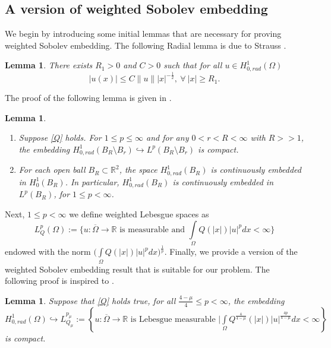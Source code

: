 \documentclass[11pt]{amsart}
\numberwithin{equation}{section}
\newtheorem{lem}[thm]{Lemma}
\newcommand{\R}{\mathbb{R}}
\newcommand{\hr}{H^1_{0, rad}(\Omega)}
\newcommand{\1}{\frac{1}{2}}
\begin{document}
	\subsection{A version of weighted Sobolev embedding}
	We begin by introducing some initial lemmas that are necessary for proving weighted Sobolev embedding. The following Radial lemma is due to Strauss \cite{Strauss}.
	\begin{lem}
		\label{lem1}
		There exists $R_1>0$ and $C>0$ such that for all $u\in H^1_{0, rad} (\Omega)$
		\begin{equation*}
			|u(x)| \leq C \|u\| |x|^{-\1}, \ \forall \ |x|\geq R_1.
		\end{equation*}  
	\end{lem}
	The proof of the following lemma is given in \cite{Su}.
	\begin{lem}
		\label{lem2}
		\begin{enumerate}
			\item[(i)] Suppose \eqref{Q} holds. For $1\leq p \leq \infty$ and for any $0<r<R<\infty$ with $R>>1$, the embedding $ H^1_{0, rad}(B_R \setminus B_r) \hookrightarrow L^p(B_R\setminus B_r)$ is compact. \item[(ii)] For each open ball $B_R \subset \R^2$, the space $H^1_{0, rad}(B_R)$ is continuously embedded in $H^1_0(B_R)$. In particular, $H^1_{0, rad}(B_R)$ is continuously embedded in $L^p(B_R)$, for $ 1 \leq p <\infty$.
		\end{enumerate}
	\end{lem}
	Next, $1 \leq p < \infty$ we define weighted Lebesgue spaces as
	\[ L_Q^p(\Omega) := \{ u: \overline{\Omega} \rightarrow \R \text{ is measurable and } \int\limits_\Omega Q(|x|) |u|^p dx < \infty\}\]
	endowed with the norm $\Bigg( \int\limits_\Omega Q(|x|)|u|^p dx\Bigg)^{\frac{1}{p}}$.
	Finally, we provide a version of the weighted Sobolev embedding result that is suitable for our problem. The following proof is inspired to \cite{Albuquerque}. 
	\begin{lem}
		\label{lem3}
		Suppose that \eqref{Q} holds true, for all $\frac{4-\mu}{4} \leq p <\infty$, the embedding $\hr \hookrightarrow L^{p_\mu}_{Q_\mu} := \left\{ u: \overline{\Omega} \rightarrow \R \text{ is Lebesgue measurable } \Big| \int\limits_\Omega Q^{\frac{4}{4-\mu}}(|x|) |u|^{\frac{4p}{4-\mu}}dx < \infty \right\}$ is compact.
	\end{lem}
\end{document}
